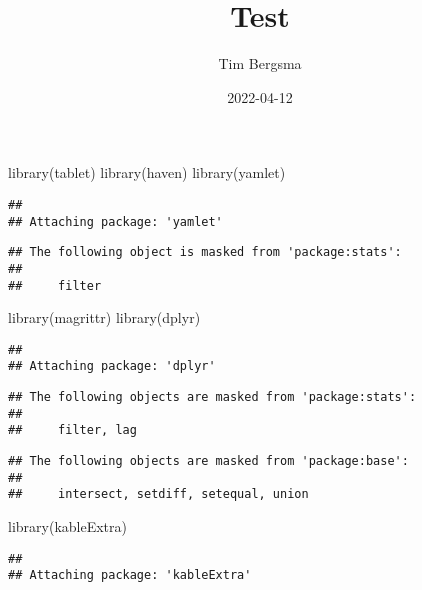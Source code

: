 \documentclass[
]{article}
\title{Test}
\author{Tim Bergsma}
\date{2022-04-12}
\newenvironment{Shaded}{\begin{snugshade}}{\end{snugshade}}
\newcommand{\FunctionTok}[1]{\textcolor[rgb]{0.00,0.00,0.00}{#1}}
\newcommand{\NormalTok}[1]{#1}
\begin{document}
\maketitle

{
\setcounter{tocdepth}{2}
\tableofcontents
}
\begin{Shaded}
\begin{Highlighting}[]
\FunctionTok{library}\NormalTok{(tablet)}
\FunctionTok{library}\NormalTok{(haven)}
\FunctionTok{library}\NormalTok{(yamlet)}
\end{Highlighting}
\end{Shaded}

\begin{verbatim}
## 
## Attaching package: 'yamlet'
\end{verbatim}

\begin{verbatim}
## The following object is masked from 'package:stats':
## 
##     filter
\end{verbatim}

\begin{Shaded}
\begin{Highlighting}[]
\FunctionTok{library}\NormalTok{(magrittr)}
\FunctionTok{library}\NormalTok{(dplyr)}
\end{Highlighting}
\end{Shaded}

\begin{verbatim}
## 
## Attaching package: 'dplyr'
\end{verbatim}

\begin{verbatim}
## The following objects are masked from 'package:stats':
## 
##     filter, lag
\end{verbatim}

\begin{verbatim}
## The following objects are masked from 'package:base':
## 
##     intersect, setdiff, setequal, union
\end{verbatim}

\begin{Shaded}
\begin{Highlighting}[]
\FunctionTok{library}\NormalTok{(kableExtra)}
\end{Highlighting}
\end{Shaded}

\begin{verbatim}
## 
## Attaching package: 'kableExtra'
\end{verbatim}
\end{document}
